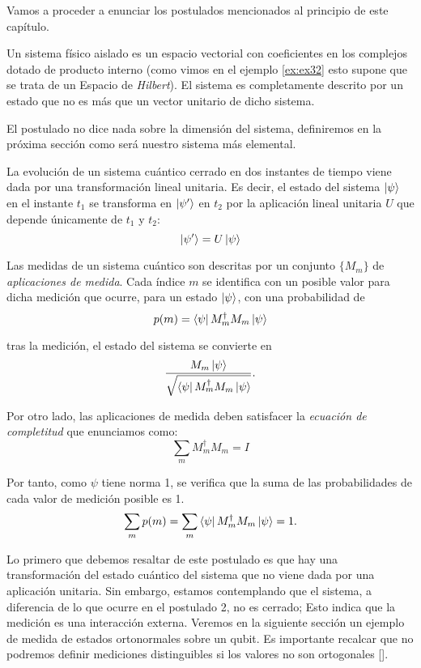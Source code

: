 Vamos a proceder a enunciar los postulados mencionados al principio de este capítulo.

\begin{postulate} Un sistema físico aislado es un espacio vectorial con coeficientes en los complejos dotado de producto interno (como vimos en el ejemplo \ref{ex:ex32} esto supone que se trata de un Espacio de \textit{Hilbert}). El sistema es completamente descrito por un estado que no es más que un vector unitario de dicho sistema.
\end{postulate}

El postulado no dice nada sobre la dimensión del sistema, definiremos en la próxima sección como será nuestro sistema más elemental.

\begin{postulate} La evolución de un sistema cuántico cerrado en dos instantes de tiempo viene dada por una transformación lineal unitaria. Es decir, el estado del sistema $\left|\psi\right\rangle$ en el instante $t_1$ se transforma en $\left|\psi'\right\rangle$ en $t_2$ por la aplicación lineal unitaria $U$ que depende únicamente de $t_1$ y $t_2$:
\[\left|\psi'\right\rangle=U\left|\psi\right\rangle\]
\end{postulate}

\begin{postulate} Las medidas de un sistema cuántico son descritas por un conjunto $\{M_m \}$ de \textit{aplicaciones de medida}. Cada índice $m$ se identifica con un posible valor para dicha medición que ocurre, para un estado $\left|\psi\right\rangle$, con una probabilidad de 
\[p(m)=\left\langle\psi\right|M_m^\dag M_m\left|\psi\right\rangle\]

tras la medición, el estado del sistema se convierte en
\[\dfrac{M_m\left|\psi\right\rangle}{\sqrt{\left\langle\psi\right|M_m^\dag M_m\left|\psi\right\rangle}}.\]

Por otro lado, las aplicaciones de medida deben satisfacer la \textit{ecuación de completitud} que enunciamos como:
\[\sum_m M_m^\dag M_m = I\]

Por tanto, como $\psi$ tiene norma 1, se verifica que la suma de las probabilidades de cada valor de medición posible es 1.
\[\sum_m p(m)=\sum_m \left\langle\psi\right|M_m^\dag M_m\left|\psi\right\rangle = 1.\]
\end{postulate}

Lo primero que debemos resaltar de este postulado es que hay una transformación del estado cuántico del sistema que no viene dada por una aplicación unitaria. Sin embargo, estamos contemplando que el sistema, a diferencia de lo que ocurre en el postulado 2,  no es cerrado; Esto indica que la medición es una interacción externa. Veremos en la siguiente sección un ejemplo de medida de estados ortonormales sobre un qubit. Es importante recalcar que no podremos definir mediciones distinguibles si los valores no son ortogonales [\cite[p.~87]{nielsen2001quantum}]. 

